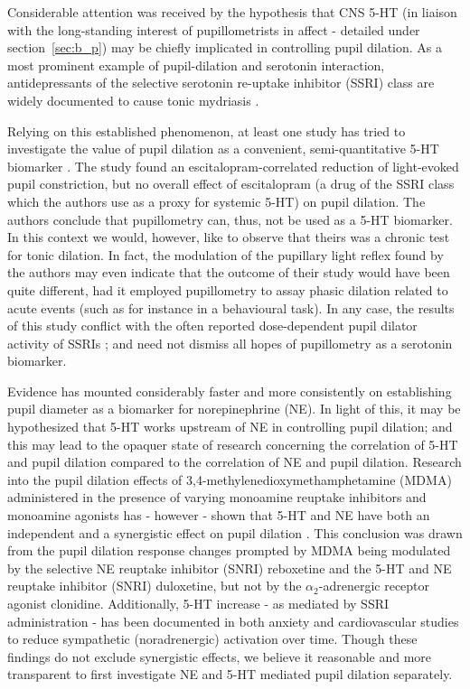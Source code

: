 	Considerable attention was received by the hypothesis that CNS 5-HT (in liaison with the long-standing interest of pupillometrists in affect - detailed under section~\ref{sec:b_p}) may be chiefly implicated in controlling pupil dilation.
	As a most prominent example of pupil-dilation and serotonin interaction, antidepressants of the selective serotonin re-uptake inhibitor (SSRI) class are widely documented to cause tonic mydriasis \citep{Fitzgerald2013,Klein-Schwartz2012}.
	
	Relying on this established phenomenon, at least one study has tried to investigate the value of pupil dilation as a convenient, semi-quantitative 5-HT biomarker \citep{Noehr-Jensen2009}.
	The study found an escitalopram-correlated reduction of light-evoked pupil constriction, but no overall effect of escitalopram (a drug of the SSRI class which the authors use as a proxy for systemic 5-HT) on pupil dilation.
	The authors conclude that pupillometry can, thus, not be used as a 5-HT biomarker.
	In this context we would, however, like to observe that theirs was a chronic test for tonic dilation.
	In fact, the modulation of the pupillary light reflex found by the authors may even indicate that the outcome of their study would have been quite different, had it employed pupillometry to assay phasic dilation related to acute events (such as for instance in a behavioural task).
	In any case, the results of this study conflict with the often reported dose-dependent pupil dilator activity of SSRIs \citep{Nielsen2010,Fitzgerald2013,Klein-Schwartz2012};
	and need not dismiss all hopes of pupillometry as a serotonin biomarker.
	
	Evidence has mounted considerably faster and more consistently on establishing pupil diameter as a biomarker for norepinephrine (NE).
	In light of this, it may be hypothesized that 5-HT works upstream of NE in controlling pupil dilation; and this may lead to the opaquer state of research concerning the correlation of 5-HT and pupil dilation compared to the correlation of NE and pupil dilation.
	Research into the pupil dilation effects of 3,4-methylenedioxymethamphetamine (MDMA) administered in the presence of varying monoamine reuptake inhibitors and monoamine agonists has - however - shown that 5-HT and NE have both an independent and a synergistic effect on pupil dilation \citep{Hysek2012}.
	This conclusion was drawn from the pupil dilation response changes prompted by MDMA being modulated by the selective NE reuptake inhibitor (SNRI) reboxetine and the 5-HT and NE reuptake inhibitor (SNRI) duloxetine, but not by the $\alpha_2$-adrenergic receptor agonist clonidine.
	Additionally, 5-HT increase - as mediated by SSRI administration - has been documented in both anxiety \citep{Blier2007} and cardiovascular \citep{Barton2007} studies to reduce sympathetic (noradrenergic) activation over time. 
	Though these findings do not exclude synergistic effects, we believe it reasonable and more transparent to first investigate NE and 5-HT mediated pupil dilation separately.
	
